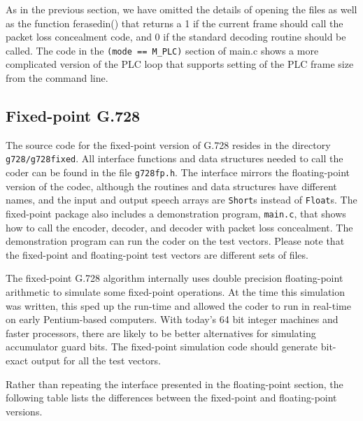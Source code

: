 As in the previous section, we have omitted the details of opening the files
as well as the function ferasedin() that returns a 1 if the current frame
should call the packet loss concealment code, and 0 if the standard decoding
routine should be called. The code in the {\tt (mode == M\_PLC)} section of
main.c shows a more complicated version of the PLC loop that supports
setting of the PLC frame size from the command line.

\subsection {Fixed-point G.728}

The source code for the fixed-point version of G.728 resides in the
directory {\tt g728/g728fixed}. All interface functions and data
structures needed to call the coder can be found in the
file {\tt g728fp.h}. The interface mirrors the floating-point
version of the codec, although the routines and data structures
have different names, and the input and output speech arrays are
{\tt Short}s instead of {\tt Float}s.
The fixed-point package also includes a demonstration program, {\tt main.c},
that shows how to call the encoder, decoder, and decoder with
packet loss concealment. The demonstration program can
run the coder on the test vectors. Please note that the fixed-point and
floating-point test vectors are different sets of files.

The fixed-point G.728 algorithm internally uses double precision floating-point
arithmetic to simulate some fixed-point operations. At the time this simulation
was written, this sped up the run-time and allowed the
coder to run in real-time on early Pentium-based computers. With today's
64 bit integer machines and faster processors, there are likely to be
better alternatives for simulating accumulator guard bits.
The fixed-point simulation code should generate bit-exact output for
all the test vectors.

Rather than repeating the interface presented in the floating-point section,
the following table lists the differences between the fixed-point and
floating-point versions.

